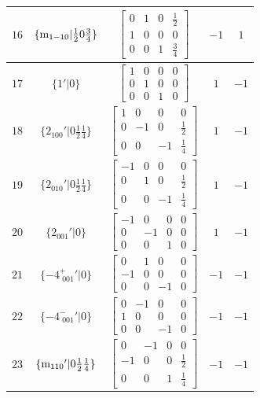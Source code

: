 \documentclass[fleqn,8pt]{jsarticle}
\begin{document}
\begin{longtable}{ccccc}
$ 16 $ & $ \{{\rm m}_{1-10}|\frac{1}{2} 0 \frac{3}{4}\} $ & $ \begin{bmatrix} 0 & 1 & 0 & \frac{1}{2} \\ 1 & 0 & 0 & 0 \\ 0 & 0 & 1 & \frac{3}{4} \end{bmatrix} $ & $ -1 $ & $ 1 $ \\ \hline
$ 17 $ & $ \{1{}'|0\} $ & $ \begin{bmatrix} 1 & 0 & 0 & 0 \\ 0 & 1 & 0 & 0 \\ 0 & 0 & 1 & 0 \end{bmatrix} $ & $ 1 $ & $ -1 $ \\ \hline
$ 18 $ & $ \{2{}_{100}{}'|0 \frac{1}{2} \frac{1}{4}\} $ & $ \begin{bmatrix} 1 & 0 & 0 & 0 \\ 0 & -1 & 0 & \frac{1}{2} \\ 0 & 0 & -1 & \frac{1}{4} \end{bmatrix} $ & $ 1 $ & $ -1 $ \\ \hline
$ 19 $ & $ \{2{}_{010}{}'|0 \frac{1}{2} \frac{1}{4}\} $ & $ \begin{bmatrix} -1 & 0 & 0 & 0 \\ 0 & 1 & 0 & \frac{1}{2} \\ 0 & 0 & -1 & \frac{1}{4} \end{bmatrix} $ & $ 1 $ & $ -1 $ \\ \hline
$ 20 $ & $ \{2{}_{001}{}'|0\} $ & $ \begin{bmatrix} -1 & 0 & 0 & 0 \\ 0 & -1 & 0 & 0 \\ 0 & 0 & 1 & 0 \end{bmatrix} $ & $ 1 $ & $ -1 $ \\ \hline
$ 21 $ & $ \{-4^{+}_{\,\,001}{}'|0\} $ & $ \begin{bmatrix} 0 & 1 & 0 & 0 \\ -1 & 0 & 0 & 0 \\ 0 & 0 & -1 & 0 \end{bmatrix} $ & $ -1 $ & $ -1 $ \\ \hline
$ 22 $ & $ \{-4^{-}_{\,\,001}{}'|0\} $ & $ \begin{bmatrix} 0 & -1 & 0 & 0 \\ 1 & 0 & 0 & 0 \\ 0 & 0 & -1 & 0 \end{bmatrix} $ & $ -1 $ & $ -1 $ \\ \hline
$ 23 $ & $ \{{\rm m}_{110}{}'|0 \frac{1}{2} \frac{1}{4}\} $ & $ \begin{bmatrix} 0 & -1 & 0 & 0 \\ -1 & 0 & 0 & \frac{1}{2} \\ 0 & 0 & 1 & \frac{1}{4} \end{bmatrix} $ & $ -1 $ & $ -1 $ \\ \hline

\end{longtable}
\end{document}
